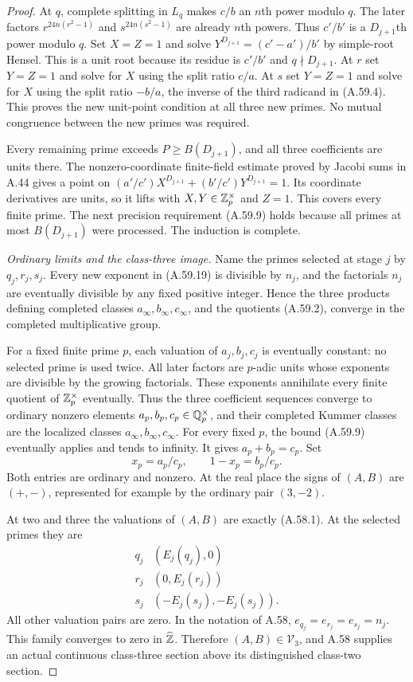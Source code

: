 \begin{proof}
At $q$, complete splitting in $L_q$ makes
$c/b$ an $n$th power modulo $q$.
The later factors $r^{24n(r^2-1)}$ and
$s^{24n(s^2-1)}$ are already $n$th powers.
Thus $c'/b'$ is a $D_{j+1}$th power modulo $q$.
Set $X=Z=1$ and solve
$Y^{D_{j+1}}=(c'-a')/b'$ by simple-root
Hensel. This is a unit root because its
residue is $c'/b'$ and $q\nmid D_{j+1}$.
At $r$ set $Y=Z=1$ and solve for $X$ using
the split ratio $c/a$.
At $s$ set $Y=Z=1$ and solve for $X$ using
the split ratio $-b/a$, the inverse of the
third radicand in (A.59.4).
This proves the new unit-point condition at
all three new primes. No mutual congruence
between the new primes was required.

Every remaining prime exceeds $P\ge B(D_{j+1})$,
and all three coefficients are units there.
The nonzero-coordinate finite-field estimate
proved by Jacobi sums in A.44 gives a point
on
$(a'/c')X^{D_{j+1}}+(b'/c')Y^{D_{j+1}}=1$.
Its coordinate derivatives are units, so it
lifts with $X,Y\in\mathbb Z_p^\times$ and $Z=1$.
This covers every finite prime.
The next precision requirement (A.59.9)
holds because all primes at most
$B(D_{j+1})$ were processed.
The induction is complete.

\emph{Ordinary limits and the class-three image.}
Name the primes selected at stage $j$ by
$q_j,r_j,s_j$. Every new exponent in (A.59.19)
is divisible by $n_j$, and the factorials
$n_j$ are eventually divisible by any fixed
positive integer. Hence the three products
defining completed classes $a_\infty,b_\infty,c_\infty$,
and the quotients (A.59.2), converge in the
completed multiplicative group.

For a fixed finite prime $p$, each valuation
of $a_j,b_j,c_j$ is eventually constant:
no selected prime is used twice. All later
factors are $p$-adic units whose exponents
are divisible by the growing factorials.
These exponents annihilate every finite
quotient of $\mathbb Z_p^\times$ eventually.
Thus the three coefficient sequences
converge to ordinary nonzero elements
$a_p,b_p,c_p\in\mathbb Q_p^\times$, and their
completed Kummer classes are the localized
classes $a_\infty,b_\infty,c_\infty$.
For every fixed $p$, the bound (A.59.9)
eventually applies and tends to infinity.
It gives $a_p+b_p=c_p$.
Set
\[
                    x_p=a_p/c_p,\qquad
                  1-x_p=b_p/c_p.
 \tag{A.59.22}
\]
Both entries are ordinary and nonzero.
At the real place the signs of $(A,B)$
are $(+,-)$, represented for example by
the ordinary pair $(3,-2)$.

At two and three the valuations of $(A,B)$
are exactly (A.58.1). At the selected primes
they are
\[
 \begin{array}{c|c}
 q_j&(E_j(q_j),0)\\
 r_j&(0,E_j(r_j))\\
 s_j&(-E_j(s_j),-E_j(s_j)).
 \end{array}
 \tag{A.59.23}
\]
All other valuation pairs are zero.
In the notation of A.58, $e_{q_j}=e_{r_j}=e_{s_j}=n_j$.
This family converges to zero in $\widehat{\mathbb Z}$.
Therefore $(A,B)\in\mathcal V_3$, and A.58
supplies an actual continuous class-three
section above its distinguished class-two
section.


\end{proof}

